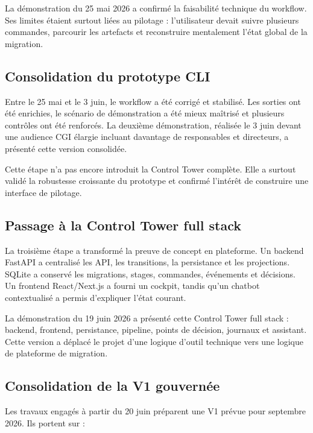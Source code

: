 La démonstration du 25 mai 2026 a confirmé la faisabilité technique du workflow. Ses limites étaient surtout liées au pilotage : l'utilisateur devait suivre plusieurs commandes, parcourir les artefacts et reconstruire mentalement l'état global de la migration.

\subsection{Consolidation du prototype CLI}

Entre le 25 mai et le 3 juin, le workflow a été corrigé et stabilisé. Les sorties ont été enrichies, le scénario de démonstration a été mieux maîtrisé et plusieurs contrôles ont été renforcés. La deuxième démonstration, réalisée le 3 juin devant une audience CGI élargie incluant davantage de responsables et directeurs, a présenté cette version consolidée.

Cette étape n'a pas encore introduit la Control Tower complète. Elle a surtout validé la robustesse croissante du prototype et confirmé l'intérêt de construire une interface de pilotage.

\subsection{Passage à la Control Tower full stack}

La troisième étape a transformé la preuve de concept en plateforme. Un backend FastAPI a centralisé les API, les transitions, la persistance et les projections. SQLite a conservé les migrations, stages, commandes, événements et décisions. Un frontend React/Next.js a fourni un cockpit, tandis qu'un chatbot contextualisé a permis d'expliquer l'état courant.

La démonstration du 19 juin 2026 a présenté cette Control Tower full stack : backend, frontend, persistance, pipeline, points de décision, journaux et assistant. Cette version a déplacé le projet d'une logique d'outil technique vers une logique de plateforme de migration.

\subsection{Consolidation de la V1 gouvernée}

Les travaux engagés à partir du 20 juin préparent une V1 prévue pour septembre 2026. Ils portent sur :

